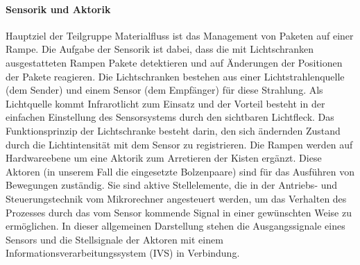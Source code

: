 \paragraph{ Sensorik und Aktorik}
Hauptziel der Teilgruppe Materialfluss ist das Management von Paketen auf einer Rampe.
Die Aufgabe der Sensorik ist dabei, dass die mit Lichtschranken ausgestatteten Rampen Pakete detektieren und auf Änderungen der Positionen der Pakete reagieren.
Die Lichtschranken bestehen aus einer Lichtstrahlenquelle (dem Sender) und einem Sensor (dem Empfänger) f\"{u}r diese Strahlung.
Als Lichtquelle kommt Infrarotlicht zum Einsatz und der Vorteil besteht in der einfachen Einstellung des Sensorsystems durch den
sichtbaren Lichtfleck. Das Funktionsprinzip der Lichtschranke besteht darin, den sich  ändernden Zustand durch die Lichtintensität mit dem Sensor zu registrieren. 
Die Rampen werden auf Hardwareebene um eine Aktorik zum Arretieren der Kisten ergänzt. Diese Aktoren (in unserem Fall die
eingesetzte Bolzenpaare) sind für das Ausführen von Bewegungen zuständig.
Sie sind aktive Stellelemente, die in der Antriebs- und Steuerungstechnik vom  Mikrorechner angesteuert werden, um das Verhalten des Prozesses durch das vom Sensor kommende Signal in einer gew\"{u}nschten Weise zu ermöglichen. In dieser allgemeinen Darstellung stehen die 
Ausgangssignale eines Sensors und die Stellsignale der Aktoren mit einem
Informationsverarbeitungssystem (IVS) in Verbindung.
